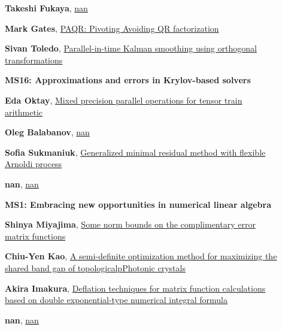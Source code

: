 \documentclass[ILAS2025-program.tex]{subfiles}
\begin{document}
\begin{description}
\begin{description}
        \item[] \hypertarget{up0340}{}\textbf{Takeshi Fukaya}, \hyperlink{down0340}{nan}
        \item[] \hypertarget{up0341}{}\textbf{Mark Gates}, \hyperlink{down0341}{PAQR: Pivoting Avoiding QR factorization}
        \item[] \hypertarget{up0342}{}\textbf{Sivan Toledo}, \hyperlink{down0342}{Parallel-in-time Kalman smoothing using orthogonal transformations
}
        \end{description}
    \begin{description}
    \item[] {\color{mstitle}\textbf{MS16: Approximations and errors in Krylov-based solvers}} 
    \item[] \hypertarget{up0343}{}\textbf{Eda Oktay}, \hyperlink{down0343}{Mixed precision parallel operations for tensor train arithmetic}
        \item[] \hypertarget{up0344}{}\textbf{Oleg Balabanov}, \hyperlink{down0344}{nan}
        \item[] \hypertarget{up0345}{}\textbf{Sofia Sukmaniuk}, \hyperlink{down0345}{Generalized minimal residual method with flexible Arnoldi process}
        \item[] \hypertarget{up0346}{}\textbf{nan}, \hyperlink{down0346}{nan}
        \end{description}
    \begin{description}
    \item[] {\color{mstitle}\textbf{MS1: Embracing new opportunities in numerical linear algebra}} 
    \item[] \hypertarget{up0347}{}\textbf{Shinya Miyajima}, \hyperlink{down0347}{Some norm bounds on the complimentary error matrix functions}
        \item[] \hypertarget{up0348}{}\textbf{Chiu-Yen Kao}, \hyperlink{down0348}{A semi-definite optimization method for maximizing the shared band gap of topologicalpPhotonic crystals}
        \item[] \hypertarget{up0349}{}\textbf{Akira Imakura}, \hyperlink{down0349}{Deflation techniques for matrix function calculations based on double exponential-type numerical integral formula}
        \item[] \hypertarget{up0350}{}\textbf{nan}, \hyperlink{down0350}{nan}

\end{description}
\end{description}
\end{document}
